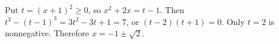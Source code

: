 Put $t=(x+1)^2\ge0$, so $x^2+2x=t-1$. Then $t^3-(t-1)^3=3t^2-3t+1=7$, or $(t-2)(t+1)=0$. Only $t=2$ is nonnegative. Therefore $\boxed{x=-1\pm\sqrt2}$.
